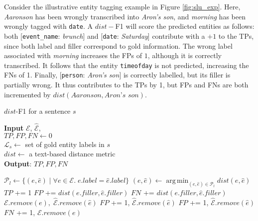 \documentclass[11pt,a4paper]{article}
\DeclareMathOperator*{\argminA}{arg\,min}
\newcommand{\tp}{TPs}
\newcommand{\fp}{FPs}
\newcommand{\fn}{FNs}
\begin{document}
Consider the illustrative entity tagging example in Figure \ref{fig:slu_exp}. 
Here, \textit{Aaronson} has been wrongly transcribed into \textit{Aron's son}, and \textit{morning} has been wrongly tagged with \texttt{date}. A $dist-$F1 will score the predicted entities as follows:
both [\texttt{event\_name}: \textit{brunch}] and [\texttt{date}: \textit{Saturday}] contribute with a $+1$ to the \tp{}, since both label and filler correspond to gold information. The wrong label associated with \textit{morning} increases the \fp{} of $1$, although it is correctly transcribed. It follows that the entity \texttt{timeofday} is not predicted, increasing the \fn{} of 1. Finally, [\texttt{person}: \textit{Aron's son}] is correctly labelled, but its filler is partially wrong. It thus contributes to the \tp{} by 1, but \fp{} and \fn{} are both incremented by $dist(\textit{Aaronson}, \textit{Aron's son})$. 
\begin{algorithm}
    \footnotesize
	\caption{$dist$-F1 for a sentence $s$}
\textbf{Input} $\mathcal{E}$, $\mathcal{\hat{E}}$,\\
    \hspace*{\algorithmicindent} \hspace{0.2cm} $TP, FP, FN \leftarrow 0$ \\
    \hspace*{\algorithmicindent} \hspace{0.2cm} $\mathcal{L}_s\leftarrow$ set of gold entity labels in $s$\\
    \hspace*{\algorithmicindent} \hspace{0.2cm} $dist \leftarrow$ a text-based distance metric\\
    \textbf{Output}: $TP, FP, FN$
	\begin{algorithmic}[1]
		        \State $\mathcal{P}_l\leftarrow \{(e, \hat{e}) \; | \; \forall e \in \mathcal{E} . \; e.label = \hat{e}.label \}$ 
		            \State $(e, \hat{e})\leftarrow \argminA_{(e, \hat{e}) \in \mathcal{P}_l} dist(e, \hat{e})$
		            \State $TP$ += 1
		            \State $FP$ += $dist(e.filler, \hat{e}.filler)$
		            \State $FN$ += $dist(e.filler, \hat{e}.filler)$
		            \State $\mathcal{E}.remove(e), \; \mathcal{\hat{E}}.remove(\hat{e})$
		        \Else
		            \State $FP$ += 1, $\mathcal{\hat{E}}.remove(\hat{e})$
		        \EndIf
		   \Else
		        \State $FP$ += 1, $\mathcal{\hat{E}}.remove(\hat{e})$
		   \EndIf
		\EndFor
		    \State $FN$ += 1, $\mathcal{E}.remove(e)$
		\EndFor
	\end{algorithmic} 
	\label{lst:werf1} 
\end{algorithm}
\end{document}
